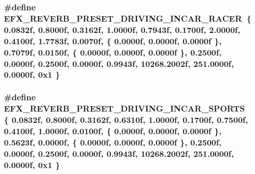 \subsubsection[{\texorpdfstring{E\+F\+X\+\_\+\+R\+E\+V\+E\+R\+B\+\_\+\+P\+R\+E\+S\+E\+T\+\_\+\+D\+R\+I\+V\+I\+N\+G\+\_\+\+I\+N\+C\+A\+R\+\_\+\+R\+A\+C\+ER}{EFX_REVERB_PRESET_DRIVING_INCAR_RACER}}]{\setlength{\rightskip}{0pt plus 5cm}\#define E\+F\+X\+\_\+\+R\+E\+V\+E\+R\+B\+\_\+\+P\+R\+E\+S\+E\+T\+\_\+\+D\+R\+I\+V\+I\+N\+G\+\_\+\+I\+N\+C\+A\+R\+\_\+\+R\+A\+C\+ER~\{ 0.\+0832f, 0.\+8000f, 0.\+3162f, 1.\+0000f, 0.\+7943f, 0.\+1700f, 2.\+0000f, 0.\+4100f, 1.\+7783f, 0.\+0070f, \{ 0.\+0000f, 0.\+0000f, 0.\+0000f \}, 0.\+7079f, 0.\+0150f, \{ 0.\+0000f, 0.\+0000f, 0.\+0000f \}, 0.\+2500f, 0.\+0000f, 0.\+2500f, 0.\+0000f, 0.\+9943f, 10268.\+2002f, 251.\+0000f, 0.\+0000f, 0x1 \}}\hypertarget{efx-presets_8h_a2c7d0be0205e92c225e1c5cd96425ef1}{}\label{efx-presets_8h_a2c7d0be0205e92c225e1c5cd96425ef1}
\subsubsection[{\texorpdfstring{E\+F\+X\+\_\+\+R\+E\+V\+E\+R\+B\+\_\+\+P\+R\+E\+S\+E\+T\+\_\+\+D\+R\+I\+V\+I\+N\+G\+\_\+\+I\+N\+C\+A\+R\+\_\+\+S\+P\+O\+R\+TS}{EFX_REVERB_PRESET_DRIVING_INCAR_SPORTS}}]{\setlength{\rightskip}{0pt plus 5cm}\#define E\+F\+X\+\_\+\+R\+E\+V\+E\+R\+B\+\_\+\+P\+R\+E\+S\+E\+T\+\_\+\+D\+R\+I\+V\+I\+N\+G\+\_\+\+I\+N\+C\+A\+R\+\_\+\+S\+P\+O\+R\+TS~\{ 0.\+0832f, 0.\+8000f, 0.\+3162f, 0.\+6310f, 1.\+0000f, 0.\+1700f, 0.\+7500f, 0.\+4100f, 1.\+0000f, 0.\+0100f, \{ 0.\+0000f, 0.\+0000f, 0.\+0000f \}, 0.\+5623f, 0.\+0000f, \{ 0.\+0000f, 0.\+0000f, 0.\+0000f \}, 0.\+2500f, 0.\+0000f, 0.\+2500f, 0.\+0000f, 0.\+9943f, 10268.\+2002f, 251.\+0000f, 0.\+0000f, 0x1 \}}\hypertarget{efx-presets_8h_aa42380cee817f0f23be5f9a103f9a723}{}\label{efx-presets_8h_aa42380cee817f0f23be5f9a103f9a723}
